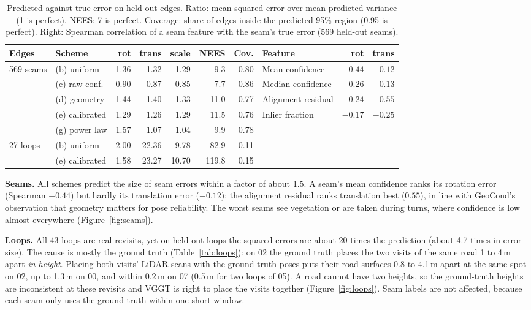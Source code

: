 \documentclass[11pt, a4paper]{article}
\begin{document}
\begin{table}[H]
\centering
\caption{Predicted against true error on held-out edges. Ratio: mean squared error over mean predicted variance (1 is
perfect). NEES: 7 is perfect. Coverage: share of edges inside the predicted 95\% region (0.95 is perfect). Right:
Spearman correlation of a seam feature with the seam's true error (569 held-out seams).}
\label{tab:edges}
\small
\begin{tabular}{llrrrrr@{\hspace{1.8em}}lrr}
\toprule
Edges & Scheme & rot & trans & scale & NEES & Cov. & Feature & rot & trans \\
\midrule
569 seams & (b) uniform    & 1.36 & 1.32 & 1.29 &  9.3 & 0.80 & Mean confidence    & $-0.44$ & $-0.12$ \\
          & (c) raw conf.  & 0.90 & 0.87 & 0.85 &  7.7 & 0.86 & Median confidence  & $-0.26$ & $-0.13$ \\
          & (d) geometry   & 1.44 & 1.40 & 1.33 & 11.0 & 0.77 & Alignment residual & $0.24$ & $\mathbf{0.55}$ \\
          & (e) calibrated & 1.29 & 1.26 & 1.29 & 11.5 & 0.76 & Inlier fraction    & $-0.17$ & $-0.25$ \\
          & (g) power law  & 1.57 & 1.07 & 1.04 &  9.9 & 0.78 & & & \\
\midrule
27 loops  & (b) uniform    & 2.00 & 22.36 &  9.78 &  82.9 & 0.11 & & & \\
          & (e) calibrated & 1.58 & 23.27 & 10.70 & 119.8 & 0.15 & & & \\
\bottomrule
\end{tabular}
\end{table}

\noindent \textbf{Seams.} All schemes predict the size of seam errors within a factor of about 1.5. A seam's mean
confidence ranks its rotation error (Spearman $-0.44$) but hardly its translation error ($-0.12$); the alignment residual
ranks translation best ($0.55$), in line with GeoCond's observation that geometry matters for pose reliability. The worst
seams see vegetation or are taken during turns, where confidence is low almost everywhere (Figure~\ref{fig:seams}).

\noindent \textbf{Loops.} All 43 loops are real revisits, yet on held-out loops the squared errors are about 20 times the
prediction (about 4.7 times in error size). The cause is mostly the ground truth (Table~\ref{tab:loops}): on 02 the ground
truth places the two visits of the same road 1 to 4\,m apart \emph{in height}. Placing both visits' LiDAR scans with the
ground-truth poses puts their road surfaces 0.8 to 4.1\,m apart at the same spot on 02, up to 1.3\,m on 00, and within
0.2\,m on 07 (0.5\,m for two loops of 05). A road cannot have two heights, so the ground-truth heights are inconsistent at
these revisits and VGGT is right to place the visits together (Figure~\ref{fig:loops}). Seam labels are not affected,
because each seam only uses the ground truth within one short window.
\end{document}
